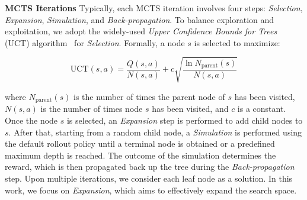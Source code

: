 \textbf{MCTS Iterations}
\hspace{5pt}
Typically, each MCTS iteration involves four steps: \textit{Selection}, \textit{Expansion}, \textit{Simulation}, and \textit{Back-propagation}.
To balance exploration and exploitation, we adopt the widely-used \textit{Upper Confidence Bounds for Trees} (UCT) algorithm~\cite{mcts-1} for \textit{Selection}.
Formally, a node $s$ is selected to maximize:
\begin{small}
\begin{equation}
    \mathrm{UCT}(s,a) = \frac{Q(s,a)}{N(s,a)} + c \sqrt{\frac{\ln{N_{\mathrm{parent}} (s)}}{N(s,a)}}
\end{equation}
\end{small}
where $N_{\mathrm{parent}} (s)$ is the number of times the parent node of $s$ has been visited, $N(s,a)$ is the number of times node $s$ has been visited, and $c$ is a constant.
Once the node $s$ is selected, an \textit{Expansion} step is performed to add child nodes to $s$.
After that, starting from a random child node, a \textit{Simulation} is performed using the default rollout policy until a terminal node is obtained or a predefined maximum depth is reached.
The outcome of the simulation determines the reward, which is then propagated back up the tree during the \textit{Back-propagation} step. 
Upon multiple iterations, we consider each leaf node as a solution. 
In this work, we focus on \textit{Expansion}, which aims to effectively expand the search space.

% 



